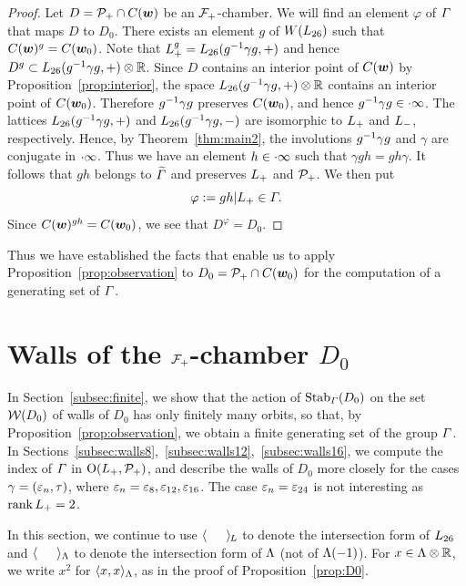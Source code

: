 \documentclass{amsart} %
\begin{document}
%
\begin{proof}
Let $D=\mathord{\mathcal{P}}_{+} \cap \mathord{C}(\boldsymbol{w})$ be an $\mathord{\mathcal{F}}_{+}$-chamber.
We will find an element $\varphi$ of $\varGamma$ 
that maps $D$ to $D_0$.
There exists an element $g$ of $W(L_{26})$
such that $\mathord{C}(\boldsymbol{w})^g=\mathord{C}(\boldsymbol{w}_0)$.
Note that $L_{+}^g=L_{26}(g^{-1} \gamma g, +)$
and hence $D^g\subset L_{26}(g^{-1} \gamma g, +)\otimes \mathord{\mathbb{R}}$.
Since $D$ contains an interior point of $\mathord{C}(\boldsymbol{w})$  by 
Proposition~\ref{prop:interior},
the space $L_{26}(g^{-1} \gamma g, +)\otimes \mathord{\mathbb{R}}$ contains an interior point of $\mathord{C}(\boldsymbol{w}_0)$.
Therefore $g^{-1} \gamma g$ preserves $\mathord{C}(\boldsymbol{w}_0)$,
and hence $g^{-1} \gamma g \in \cdot \infty$.
The lattices  $L_{26}(g^{-1} \gamma g, + )$  and $L_{26}(g^{-1} \gamma g, -)$
are isomorphic to $L_{+}$ and $L_{-}$, respectively.
Hence, by Theorem~\ref{thm:main2},
the involutions $g^{-1} \gamma g$ and $\gamma$ are conjugate in $\cdot \infty$.
Thus  we have an element $h\in \cdot \infty$
such that $\gamma g h =gh\gamma $.
It follows that $gh$ belongs to $\widetilde{\varGamma}$ and preserves $L_{+}$ and $\mathord{\mathcal{P}}_{+}$.
We then put
\[
\varphi:=gh|L_{+}\in \varGamma.
\]
Since $\mathord{C}(\boldsymbol{w})^{gh}=\mathord{C}(\boldsymbol{w}_0)$,
we see that  $D^\varphi=D_0$.
\end{proof}
%
Thus we have established the facts that enable us 
to  apply Proposition~\ref{prop:observation}
to $D_0=\mathord{\mathcal{P}}_{+}\cap \mathord{C}(\boldsymbol{w}_0)$ 
for the computation of   a generating set of
$\varGamma$.
%
%
\section{Walls of the $\mathord{\mathcal{F}}_{+}$-chamber $D_0$}\label{sec:wallsD0}
%
In Section~\ref{subsec:finite},
we show that 
the action of  $\operatorname{Stab}_{\varGamma}(D_0)$ on the set $\mathord{\mathcal{W}}(D_0)$ of 
walls of $D_0$ has only finitely many  orbits,
so that, by Proposition~\ref{prop:observation},
we obtain a finite generating set of the group $\varGamma$.
In Sections~\ref{subsec:walls8},~\ref{subsec:walls12},~\ref{subsec:walls16}, 
we compute the index of $\varGamma$ in
$\mathord{\mathrm{O}}(L_{+}, \mathord{\mathcal{P}}_{+})$,
and  describe the walls of $D_0$ more closely
for the cases $\gamma=(\varepsilon_n, \tau)$,
where $\varepsilon_n=\varepsilon_8, \varepsilon_{12}, \varepsilon_{16}$.
The case $\varepsilon_n=\varepsilon_{24}$ is not interesting as $\operatorname{rank} L_{+}=2$.
%
\par
In this section,
we continue to use
$\langle \phantom{a, a} \rangle_{\hskip -1pt L}$ to denote the intersection form of $L_{26}$
and $\langle \phantom{a, a} \rangle_{\Lambda}$ to denote the intersection form of $\Lambda$
(not of $\Lambda(-1)$).
For $x\in \Lambda\otimes\mathord{\mathbb{R}}$, we write $x^2$ for $\langle x,x \rangle_{\Lambda}$,
as in the proof of Proposition~\ref{prop:D0}.
%
\end{document}
